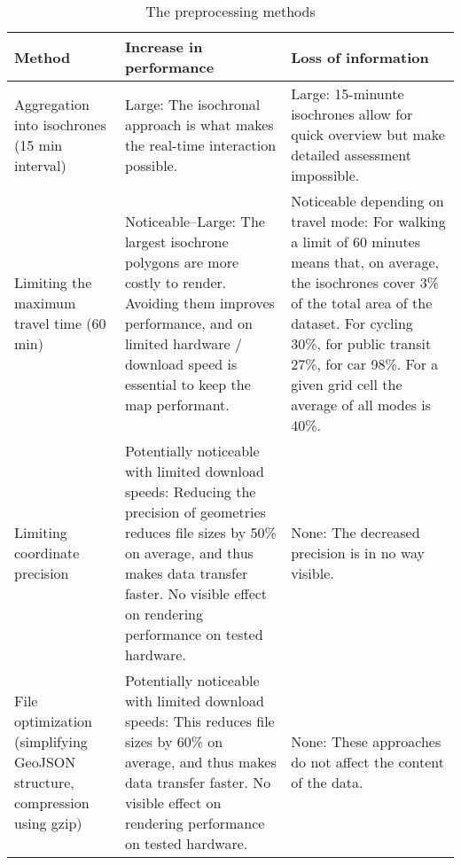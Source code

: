 \begin{table}[H]
	\caption{The preprocessing methods}
	\label{tab:preprocessing methods}
	\centering
	\begin{tabular}{ | L{0.2\textwidth} | L{0.35\textwidth} | L{0.35\textwidth} | }
		\hline
		Method
		& Increase in performance
		& Loss of information
		\\
		\hline
		\hline
		Aggregation into isochrones (15 min interval)
		& Large: The isochronal approach is what makes the real-time interaction possible.
		& Large: 15-minunte isochrones allow for quick overview but make detailed assessment impossible.
		\\
		\hline
		Limiting the maximum travel time (60 min)
		& Noticeable--Large: The largest isochrone polygons are more costly to render.
		Avoiding them improves performance, and on limited hardware / download speed
		is essential to keep the map performant.
		& Noticeable depending on travel mode:
		For walking a limit of 60 minutes means that, on average,
		the isochrones cover 3\% of the total area of the dataset.
		For cycling 30\%, for public transit 27\%, for car 98\%.
		For a given grid cell the average of all modes is 40\%.
		\\
		\hline
		Limiting coordinate precision
		& Potentially noticeable with limited download speeds:
		Reducing the precision of geometries reduces file sizes by 50\% on average,  %
		and thus makes data transfer faster.
		No visible effect on rendering performance on tested hardware.
		& None: The decreased precision is in no way visible.
		\\
		\hline
		File optimization (simplifying GeoJSON structure, compression using gzip)
		& Potentially noticeable with limited download speeds:
		This reduces file sizes by 60\% on average,  %
		and thus makes data transfer faster.
		No visible effect on rendering performance on tested hardware.
		& None: These approaches do not affect the content of the data.
		\\
		\hline
	\end{tabular}
\end{table}
